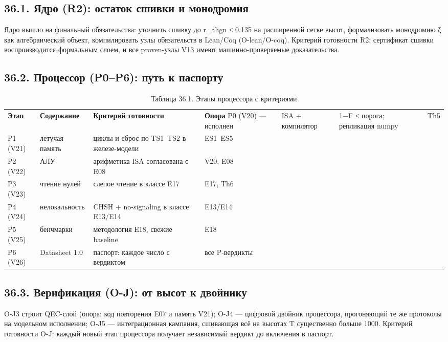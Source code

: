\documentclass[11pt,a4paper]{article}
\begin{document}
\subsection{36.1. Ядро (R2): остаток сшивки и монодромия}

Ядро вышло на финальный обязательства: уточнить сшивку до r\_align ≤ 0.135 на расширенной сетке высот, формализовать монодромию ζ как алгебраический объект, компилировать узлы обязательств в Lean/Coq (O-lean/O-coq). Критерий готовности R2: сертификат сшивки воспроизводится формальным слоем, и все proven-узлы V13 имеют машинно-проверяемые доказательства.

\subsection{36.2. Процессор (P0–P6): путь к паспорту}

\begin{table}[htbp]\centering\small
\caption{Таблица 36.1. Этапы процессора с критериями}
\begin{tabular}{p{} p{} p{} p{}}
\toprule
\textbf{Этап} & \textbf{Содержание} & \textbf{Критерий готовности} & \textbf{Опора}
\midrule
P0 (V20) — исполнен & ISA + компилятор & 1−F ≤ порога; репликация numpy & Th5 \\
P1 (V21) & летучая память & циклы и сброс по TS1–TS2 в железе-модели & ES1–ES5 \\
P2 (V22) & АЛУ & арифметика ISA согласована с E08 & V20, E08 \\
P3 (V23) & чтение нулей & слепое чтение в классе E17 & E17, Th6 \\
P4 (V24) & нелокальность & CHSH + no-signaling в классе E13/E14 & E13/E14 \\
P5 (V25) & бенчмарки & методология E18, свежие baseline & E18 \\
P6 (V26) & Datasheet 1.0 & паспорт: каждое число с вердиктом & все P-вердикты \\
\bottomrule
\end{tabular}
\end{table}

\subsection{36.3. Верификация (O-J): от высот к двойнику}

O-J3 строит QEC-слой (опора: код повторения E07 и память V21); O-J4 — цифровой двойник процессора, прогоняющий те же протоколы на модельном исполнении; O-J5 — интеграционная кампания, сшивающая всё на высотах T существенно больше 1000. Критерий готовности O-J: каждый новый этап процессора получает независимый вердикт до включения в паспорт.
\end{document}
